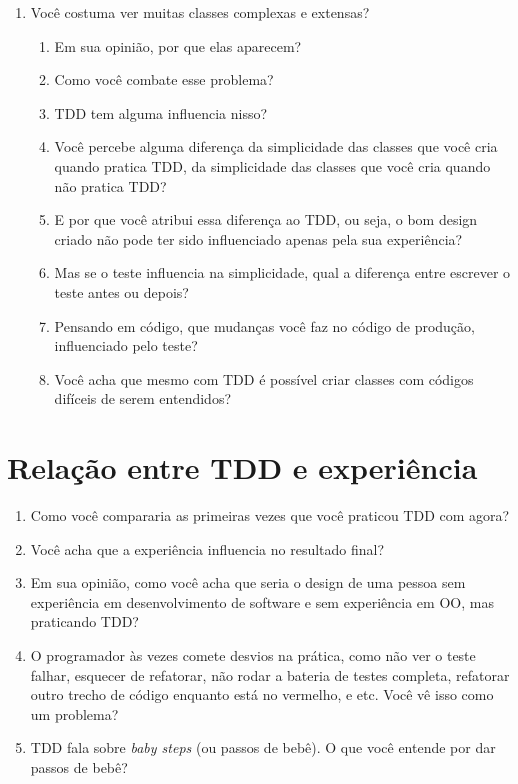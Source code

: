 \begin{enumerate}
	\item{Você costuma ver muitas classes complexas e extensas?}
		\begin{enumerate}
			\item Em sua opinião, por que elas aparecem?

			\item Como você combate esse problema?

			\item TDD tem alguma influencia nisso?
			
			\item Você percebe alguma diferença da simplicidade das classes que você cria quando
			pratica TDD, da simplicidade das classes que você cria quando não pratica TDD?
			
			\item E por que você atribui essa diferença ao TDD, ou seja, o bom design
			criado não pode ter sido influenciado apenas pela sua experiência?
			
			\item Mas se o teste influencia na simplicidade, 
			qual a diferença entre escrever o teste antes ou depois?
			
			\item Pensando em código, que mudanças você faz no código de produção, influenciado
			pelo teste?

			\item Você acha que mesmo com TDD é possível criar classes com códigos difíceis de serem entendidos? 

		\end{enumerate}
\end{enumerate}

\section{Relação entre TDD e experiência}
\label{entrevista:experiencia}

\begin{enumerate}
	\item Como você compararia as primeiras vezes que você praticou TDD com agora?

	\item Você acha que a experiência influencia no resultado final?

	\item Em sua opinião, como você acha que seria o design de uma pessoa sem
	experiência em desenvolvimento de software e sem experiência em OO, mas praticando TDD?

	\item O programador às vezes comete desvios na prática, como não ver o teste
	falhar,  esquecer de refatorar, não rodar a bateria de testes completa,
	refatorar outro trecho de código enquanto está no vermelho, e etc. Você vê isso
	como um problema?
	
	\item TDD fala sobre \textit{baby steps} (ou passos de bebê). O que você 
	entende por dar passos de bebê?

\end{enumerate}

